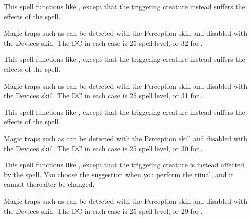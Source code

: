 \begin{spelleffect}
This spell functions like , except that the triggering creature instead suffers the effects of the  spell.
\end{spelleffect}
\begin{spellnotes}
Magic traps such as  can be detected with the Perception skill and disabled with the Devices skill. The DC in each case is 25 \add spell level, or 32 for .
\end{spellnotes}

\begin{spelleffect}
This spell functions like , except that the triggering creature instead suffers the effects of the  spell.
\end{spelleffect}
\begin{spellnotes}
Magic traps such as  can be detected with the Perception skill and disabled with the Devices skill. The DC in each case is 25 \add spell level, or 31 for .
\end{spellnotes}

\begin{spelleffect}
This spell functions like , except that the triggering creature instead suffers the effects of the  spell.
\end{spelleffect}
\begin{spellnotes}
Magic traps such as  can be detected with the Perception skill and disabled with the Devices skill. The DC in each case is 25 \add spell level, or 30 for .
\end{spellnotes}

\begin{spelleffect}
This spell functions like , except that the triggering creature is instead affected by the  spell. You choose the suggestion when you perform the ritual, and it cannot thereafter be changed.
\end{spelleffect}
\begin{spellnotes}
Magic traps such as  can be detected with the Perception skill and disabled with the Devices skill. The DC in each case is 25 \add spell level, or 29 for .
\end{spellnotes}

